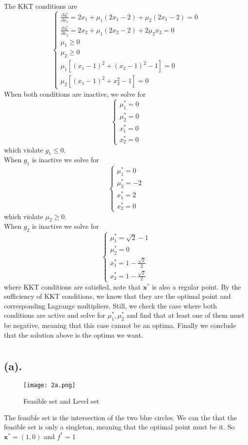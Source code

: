 \documentclass[12pt,letterpaper]{article}
\begin{document}
\section{}
The KKT conditions are
$$
\begin{cases}
\frac{\partial\mathcal{L}}{\partial x_1}=2x_1+\mu_1(2x_1-2)+\mu_2(2x_1-2)=0\\
\frac{\partial\mathcal{L}}{\partial x_2}=2x_2+\mu_1(2x_2-2)+2\mu_2x_2=0\\
\mu_1\geq0\\
\mu_2\geq0\\
\mu_1[(x_1-1)^2+(x_2-1)^2-1]=0\\
\mu_2[(x_1-1)^2+x_2^2-1]=0
\end{cases}$$
When both conditions are inactive, we solve for 
$$
\begin{cases}
\mu_1^*=0\\
\mu_2^*=0\\
x_1^*=0\\
x_2^*=0
\end{cases}$$
which violate $g_1\leq0$.\\
When $g_1$ is inactive we solve for 
$$
\begin{cases}
\mu_1^*=0\\
\mu_2^*=-2\\
x_1^*=2\\
x_2^*=0
\end{cases}$$
which violate $\mu_2\geq0$.\\
When $g_2$ is inactive we solve for
$$
\begin{cases}
\mu_1^*=\sqrt{2}-1\\
\mu_2^*=0\\
x_1^*=1-\frac{\sqrt{2}}{2}\\
x_2^*=1-\frac{\sqrt{2}}{2}
\end{cases}$$
where KKT conditions are satisfied, note that $\boldsymbol{x}^*$ is also a regular point. By the sufficiency of KKT conditions, we know that they are the optimal point and corresponding Lagrange multipliers.
Still, we check the case where both conditions are active and solve for $\mu_1^*,\mu_2^*$ and find that at least one of them must be negative, meaning that this case cannot be an optima.
Finally we conclude that the solution above is the optima we want.
\section{}
\subsection*{(a).}
\begin{figure}[h]
\centering
\texttt{[image: 2a.png]}
\caption{Feasible set and Level set}
\label{sk}
\end{figure}
The feasible set is the intersection of the two blue circles. We can the that the feasible set is only a singleton, meaning that the optimal point must be it. So $\boldsymbol{x}^*=(1,0)$ and $f^*=1$
\end{document}
